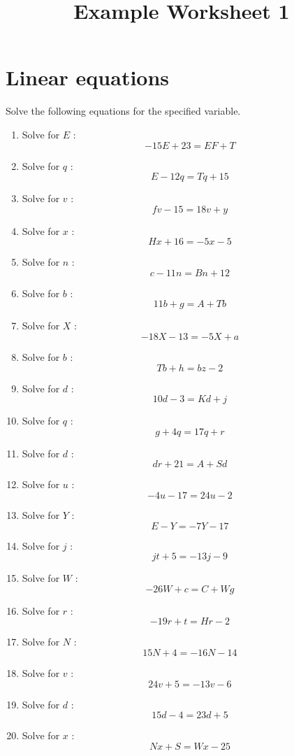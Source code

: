 \documentclass{article}
\begin{document}
    \title{Example Worksheet 1} 
 \date{\vspace{-5ex}} 
 \maketitle

        \section{Linear equations}
        Solve the following equations for the specified variable.
        \begin{multicols}{1}
        \begin{enumerate}
        \item Solve for $E$ : $$- 15 E + 23 = E F + T$$
\item Solve for $q$ : $$E - 12 q = T q + 15$$
\item Solve for $v$ : $$f v - 15 = 18 v + y$$
\item Solve for $x$ : $$H x + 16 = - 5 x - 5$$
\item Solve for $n$ : $$c - 11 n = B n + 12$$
\item Solve for $b$ : $$11 b + g = A + T b$$
\item Solve for $X$ : $$- 18 X - 13 = - 5 X + a$$
\item Solve for $b$ : $$T b + h = b z - 2$$
\item Solve for $d$ : $$10 d - 3 = K d + j$$
\item Solve for $q$ : $$g + 4 q = 17 q + r$$
\item Solve for $d$ : $$d r + 21 = A + S d$$
\item Solve for $u$ : $$- 4 u - 17 = 24 u - 2$$
\item Solve for $Y$ : $$E - Y = - 7 Y - 17$$
\item Solve for $j$ : $$j t + 5 = - 13 j - 9$$
\item Solve for $W$ : $$- 26 W + c = C + W g$$
\item Solve for $r$ : $$- 19 r + t = H r - 2$$
\item Solve for $N$ : $$15 N + 4 = - 16 N - 14$$
\item Solve for $v$ : $$24 v + 5 = - 13 v - 6$$
\item Solve for $d$ : $$15 d - 4 = 23 d + 5$$
\item Solve for $x$ : $$N x + S = W x - 25$$
        \end{enumerate}
        \end{multicols}
        
\end{document}
